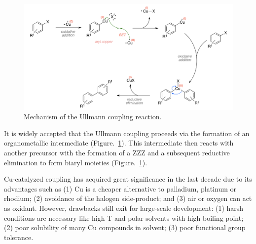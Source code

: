 \documentclass[aps,reprint,amsmath,amssymb]{revtex4-2}
\begin{document}
\begin{figure}[thb]
\centering
\includegraphics[width=0.98\columnwidth]{Fig/classical-mechanism.png}
\caption{Mechanism of the Ullmann coupling reaction.}
\label{fig:classical}
\end{figure}

It is widely accepted that the Ullmann coupling proceeds via the formation of an organometallic intermediate (Figure.~\ref{fig:classical}). 
This intermediate then reacts with another precursor with the formation of a ZZZ and a subsequent reductive elimination to form biaryl moieties (Figure.~\ref{fig:classical}). 

Cu-catalyzed coupling has acquired great significance in the last decade due to its advantages such as (1) Cu is a cheaper alternative to palladium, platinum or rhodium; (2) avoidance of the halogen side-product; and (3) air or oxygen can act as oxidant. However, drawbacks still exit for large-scale development: (1) harsh conditions are necessary like high T and polar solvents with high boiling point; (2) poor solubility of many Cu compounds in solvent; (3) poor functional group tolerance. %
\end{document}
